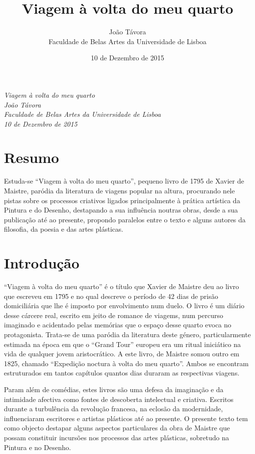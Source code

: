 \documentclass[12pt]{article}
\title{Viagem à volta do meu quarto}
\date{10 de Dezembro de 2015}
\author{João Távora \\Faculdade de Belas Artes da Universidade de Lisboa}
\begin{document}

\emph{Viagem à volta do meu quarto}\\
\emph{João Távora}\\
\emph{Faculdade de Belas Artes da Universidade de Lisboa}\\
\emph{10 de Dezembro de 2015}\\

\section{Resumo}

Estuda-se ``Viagem à volta do meu quarto'', pequeno livro de 1795 de Xavier de Maistre, paródia da literatura de viagens popular na altura, procurando nele pistas sobre os processos criativos ligados principalmente à prática artística da Pintura e do Desenho, destapando a sua influência noutras obras, desde a sua publicação até ao presente, propondo paralelos entre o texto e alguns autores da filosofia, da poesia e das artes plásticas.

\section{Introdução}

``Viagem à volta do meu quarto'' é o título que Xavier de Maistre deu ao livro que escreveu em 1795 e no qual descreve o período de 42 dias de prisão domiciliária que lhe é imposto por envolvimento num duelo. O livro é um diário desse cárcere real, escrito em jeito de romance de viagems, num percurso imaginado e acidentado pelas memórias que o espaço desse quarto evoca no protagonista. Trata-se de uma paródia da literatura deste género, particularmente estimada na época em que o ``Grand Tour'' europeu era um ritual iniciático na vida de qualquer jovem aristocrático. A este livro, de Maistre somou outro em 1825, chamado ``Expedição noctura à volta do meu quarto''. Ambos se encontram estruturados em tantos capítulos quantos dias duraram as respectivas viagens.

Param além de comédias, estes livros são uma defesa da imaginação e da intimidade afectiva como fontes de descoberta intelectual e criativa. Escritos durante a turbulência da revolução francesa, na eclosão da modernidade, influenciaram escritores e artistas plásticos até ao presente. O presente texto tem como objecto destapar alguns aspectos particulares da obra de Maistre que possam constituir incursões nos processos das artes plásticas, sobretudo na Pintura e no Desenho.
\end{document}
